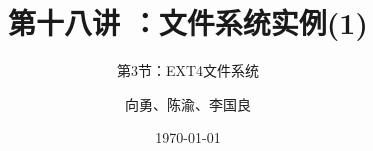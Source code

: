 


\title[第18讲]{第十八讲 ：文件系统实例(1)} %
\subtitle{第3节：EXT4文件系统}
\author{向勇、陈渝、李国良} %
\date{\today} %



\begin{frame}
\titlepage %
\end{frame}

%
